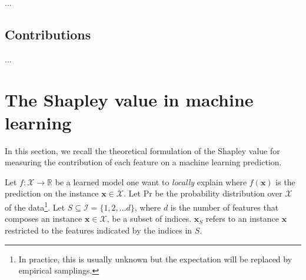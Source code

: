 \documentclass{article}
\theoremstyle{plain}
\theoremstyle{definition}
\theoremstyle{remark}
\begin{document}
...

\subsection{Contributions}

...

\section{The Shapley value in machine learning}
\label{sec:shapley}

In this section, we recall the theoretical formulation of the Shapley value for measuring the contribution of each feature on a machine learning prediction.

Let $f:\mathcal{X}\to\mathbb{R}$ be a learned model one want to \emph{locally} explain where $f(\bm{x})$ is the prediction on the instance $\bm{x}\in\mathcal{X}$. Let $\text{Pr}$ be the probability distribution over $\mathcal{X}$ of the data\footnote{In practice, this is usually unknown but the expectation will be replaced by empirical samplings.}. Let $S\subseteq \mathcal{I}=\{1,2,\dots d\}$, where $d$ is the number of features that composes an instance $\bm{x}\in\mathcal{X}$, be a subset of indices. $\bm{x}_S$ refers to an instance $\bm{x}$ restricted to the features indicated by the indices in $S$.
\end{document}
